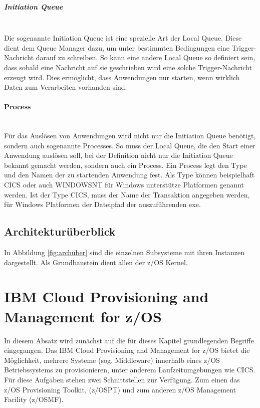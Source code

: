 \subparagraph{Initiation Queue}~\\
Die sogenannte \glqq Initiation Queue\grqq{} ist eine spezielle Art der Local Queue.
Diese dient dem Queue Manager dazu, um unter bestimmten Bedingungen eine Trigger-Nachricht darauf zu schreiben.
So kann eine andere Local Queue so definiert sein, dass sobald eine Nachricht auf sie geschrieben wird eine solche Trigger-Nachricht erzeugt wird.
Dies ermöglicht, dass Anwendungen nur starten, wenn wirklich Daten zum Verarbeiten vorhanden sind.
\cite{Aranha.2013}

\paragraph{Process}~\\
Für das Auslösen von Anwendungen wird nicht nur die Initiation Queue benötigt, sondern auch sogenannte \glqq Processes\grqq.
So muss der Local Queue, die den Start einer Anwendung auslösen soll, bei der Definition nicht nur die Initiation Queue bekannt gemacht werden, sondern auch ein Process.
Ein Process legt den \glqq Type\grqq{} und den Namen der zu startenden Anwendung fest.
Als \glqq Type\grqq{} können beispielhaft CICS oder auch WINDOWSNT für Windows unterstütze Platformen genannt werden.
Ist der \glqq Type\grqq{} CICS,  muss der Name der Transaktion angegeben werden, für Windows Platformen der Dateipfad der auszuführenden exe.
\cite{Aranha.2013}

\subsection{Architekturüberblick}
In Abbildung \ref{fig:archüber} sind die einzelnen Subsysteme mit ihren Instanzen dargestellt.
Als Grundbaustein dient allen der z/OS Kernel.

\section{IBM Cloud Provisioning and Management for z/OS}\label{sec:zosmf}
In diesem Absatz wird zunächst auf die für dieses Kapitel grundlegenden Begriffe eingegangen.
Das IBM Cloud Provisioning and Management for z/OS bietet die Möglichkeit, mehrere Systeme (sog. Middleware) innerhalb eines z/OS Betriebssystems zu provisionieren, unter anderem Laufzeitumgebungen wie CICS. 
Für diese Aufgaben stehen zwei Schnittstellen zur Verfügung.
Zum einen das z/OS Provisioning Toolkit, (z/OSPT) und zum anderen z/OS Management Facility (z/OSMF).
\cite{KeithWinnardGaryPuchkoffHirenShah.2016}

